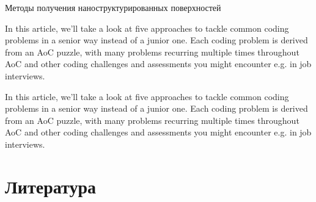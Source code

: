 \documentclass[oneside,final,12pt]{extreport}
\begin{document}
\begin{chapter} {Методы получения наноструктурированных поверхностей }

In this article, we’ll take a look at five approaches to tackle common coding problems in a senior way instead of a junior one. Each coding problem is derived from an AoC puzzle, with many problems recurring multiple times throughout AoC and other coding challenges and assessments you might encounter e.g. in job interviews.

In this article, we’ll take a look at five approaches to tackle common coding problems in a senior way instead of a junior one. Each coding problem is derived from an AoC puzzle, with many problems recurring multiple times throughout AoC and other coding challenges and assessments you might encounter e.g. in job interviews.
\end{chapter}


\newpage
\section*{Литература}
\end{document}
